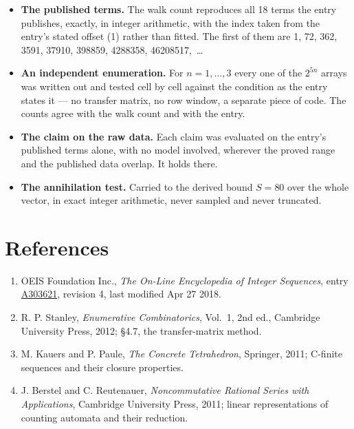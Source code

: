 \documentclass[11pt]{article}
\theoremstyle{definition}
\begin{document}
\begin{itemize}

\item {\bfseries The published terms.} The walk count reproduces all 18 terms the entry publishes, exactly, in integer arithmetic, with the index taken from the entry's stated offset (1) rather than fitted. The first of them are 1, 72, 362, 3591, 37910, 398859, 4288358, 46208517,~\dots

\item {\bfseries An independent enumeration.} For $n = 1,\dots,3$ every one of the $2^{5n}$ arrays was written out and tested cell by cell against the condition as the entry states it --- no transfer matrix, no row window, a separate piece of code. The counts agree with the walk count and with the entry.

\item {\bfseries The claim on the raw data.} Each claim was evaluated on the entry's published terms alone, with no model involved, wherever the proved range and the published data overlap. It holds there.

\item {\bfseries The annihilation test.} Carried to the derived bound $S = 80$ over the whole vector, in exact integer arithmetic, never sampled and never truncated.

\end{itemize}

\section{References}

\begin{enumerate}

\item OEIS Foundation Inc., \emph{The On-Line Encyclopedia of Integer Sequences}, entry \href{https://oeis.org/A303621}{A303621}, revision 4, last modified Apr 27 2018.

\item R. P. Stanley, \emph{Enumerative Combinatorics}, Vol.~1, 2nd ed., Cambridge University Press, 2012; \S4.7, the transfer-matrix method.

\item M. Kauers and P. Paule, \emph{The Concrete Tetrahedron}, Springer, 2011; C-finite sequences and their closure properties.

\item J. Berstel and C. Reutenauer, \emph{Noncommutative Rational Series with Applications}, Cambridge University Press, 2011; linear representations of counting automata and their reduction.

\end{enumerate}
\end{document}

